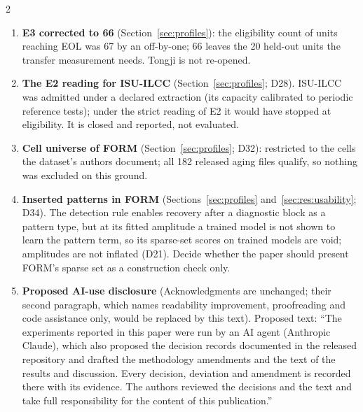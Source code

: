 \documentclass{article}
\begin{document}
\begin{revnotes}
\begin{multicols}{2}
\begin{enumerate}
\item \textbf{E3 corrected to 66} (Section~\ref{sec:profiles}): the eligibility count of units reaching EOL was 67 by an off-by-one; 66 leaves the 20 held-out units the transfer measurement needs. Tongji is not re-opened.
\item \textbf{The E2 reading for ISU-ILCC} (Section~\ref{sec:profiles}; D28). ISU-ILCC was admitted under a declared extraction (its capacity calibrated to periodic reference tests); under the strict reading of E2 it would have stopped at eligibility. It is closed and reported, not evaluated.
\item \textbf{Cell universe of FORM} (Section~\ref{sec:profiles}; D32): restricted to the cells the dataset's authors document; all 182 released aging files qualify, so nothing was excluded on this ground.
\item \textbf{Inserted patterns in FORM} (Sections~\ref{sec:profiles} and~\ref{sec:res:usability}; D34). The detection rule enables recovery after a diagnostic block as a pattern type, but at its fitted amplitude a trained model is not shown to learn the pattern term, so its sparse-set scores on trained models are void; amplitudes are not inflated (D21). Decide whether the paper should present FORM's sparse set as a construction check only.
\item \textbf{Proposed AI-use disclosure} (Acknowledgments are unchanged; their second paragraph, which names readability improvement, proofreading and code assistance only, would be replaced by this text). Proposed text: ``The experiments reported in this paper were run by an AI agent (Anthropic Claude), which also proposed the decision records documented in the released repository and drafted the methodology amendments and the text of the results and discussion. Every decision, deviation and amendment is recorded there with its evidence. The authors reviewed the decisions and the text and take full responsibility for the content of this publication.''
\end{enumerate}\end{multicols}
\end{revnotes}
\end{document}
